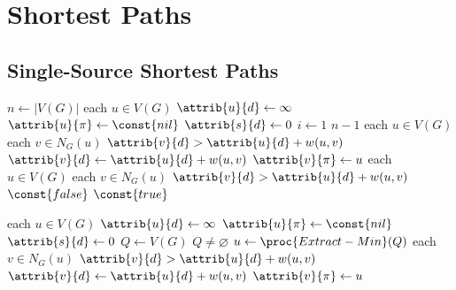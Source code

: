 \chapter{Shortest Paths}
\section{Single-Source Shortest Paths}
\begin{codebox}
  \li $n \gets |V(G)|$
  \li \For each $u \in V(G)$ \Do
  \li     $\attrib{u}{d} \gets \infty$
  \li     $\attrib{u}{\pi} \gets \const{nil}$
      \End
  \li $\attrib{s}{d} \gets 0$
  \li \For $i \gets 1$ \To $n - 1$ \Do
  \li     \For each $u \in V(G)$ \Do
  \li       \For each $v \in N_G(u)$ \Do
  \li           \If $\attrib{v}{d} > \attrib{u}{d} + w(u, v)$ \Then
  \li               $\attrib{v}{d} \gets \attrib{u}{d} + w(u, v)$
  \li               $\attrib{v}{\pi} \gets u$
                \End
            \End
          \End
      \End
  \li \For each $u \in V(G)$ \Do
  \li       \For each $v \in N_G(u)$ \Do
  \li           \If $\attrib{v}{d} > \attrib{u}{d} + w(u, v)$ \Then
  \li               \Return $\const{false}$
                \End
            \End
          \End
      \End
  \li \Return $\const{true}$
\end{codebox}

\begin{codebox}
  \li \For each $u \in V(G)$ \Do
  \li     $\attrib{u}{d} \gets \infty$
  \li     $\attrib{u}{\pi} \gets \const{nil}$
      \End
  \li $\attrib{s}{d} \gets 0$
  \li $Q \gets V(G)$
  \li \While $Q \neq \varnothing$ \Do
  \li     $u \gets \proc{Extract-Min}(Q)$
  \li     \For each $v \in N_G(u)$ \Do
  \li         \If $\attrib{v}{d} > \attrib{u}{d} + w(u, v)$ \Then
  \li             $\attrib{v}{d} \gets \attrib{u}{d} + w(u, v)$
  \li             $\attrib{v}{\pi} \gets u$
              \End
          \End
      \End
\end{codebox}